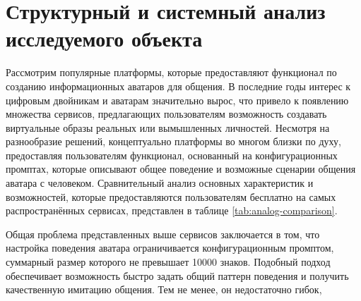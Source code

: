 \chapter{Структурный и системный анализ исследуемого объекта}

Рассмотрим популярные платформы, которые предоставляют функционал по созданию 
информационных аватаров для общения. В последние годы интерес к цифровым двойникам и 
аватарам значительно вырос, что привело к появлению множества сервисов, предлагающих 
пользователям возможность создавать виртуальные образы реальных или вымышленных личностей. 
Несмотря на разнообразие решений, концептуально платформы во многом близки по духу, 
предоставляя пользователям функционал, основанный на конфигурационных промптах, которые 
описывают общее поведение и возможные сценарии общения аватара с человеком. Сравнительный 
анализ основных характеристик и возможностей, которые предоставляются пользователям 
бесплатно на самых распространённых сервисах, представлен в таблице \ref{tab:analog-comparison}.


\begin{table}[h!]
\centering
{}
\caption{Сравнение сервисов для работы с аватарами}
\label{tab:analog-comparison}
\end{table}


Общая проблема представленных выше сервисов заключается в том, что настройка поведения 
аватара ограничивается конфигурационным промптом, суммарный размер которого не превышает 
10000 знаков. Подобный подход обеспечивает возможность быстро задать общий паттерн 
поведения и получить качественную имитацию общения. Тем не менее, он недостаточно гибок, 

